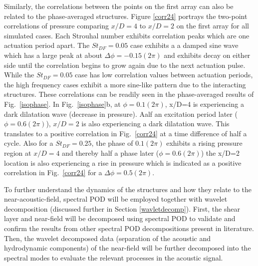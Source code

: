 \documentclass[english]{aiaa-tc}
\begin{document}
Similarly, the correlations between the points on the first array can
also be related to the phase-averaged structures. Figure \ref{corr24}
portrays the two-point correlations of pressure comparing $x/D=4$ to
$x/D=2$ on the first array for all simulated 
cases. Each Strouhal number exhibits correlation peaks which are one
actuation period apart. The $St_{DF}=0.05$ case exhibits a a damped sine wave which has a large peak
at about $\Delta \phi=-0.15(2\pi)$ 
and exhibits decay on either
side until the correlation begins to grow again due to the next
actuation pulse. While the $St_{DF}=0.05$ case has low correlation
values between actuation periods, the high frequency cases exhibit a
more sine-like pattern due to the interacting structures.  These
correlations can be readily seen in the phase-averaged results of
Fig.~\ref{isophase}. In Fig.~\ref{isophase}b, at $\phi=0.1(2\pi)$,
x/D=4 is experiencing a dark dilatation wave (decrease in pressure). 
Aalf an excitation period later ($\phi=0.6(2\pi)$), $x/D=2$ is also
experiencing a dark dilatation wave. This translates to a
positive correlation in Fig.~\ref{corr24} at a time difference of half
a cycle. Also for a
$St_{DF}=0.25$, the phase of $0.1(2\pi)$ exhibits a rising pressure
region at $x/D=4$ and thereby half a phase later ($\phi=0.6(2\pi)$)
the x/D=2 location is also experiencing a rise in pressure which is
indicated as a positive correlation in Fig.~\ref{corr24} for a $\Delta
\phi=0.5(2\pi)$. 

To further understand the dynamics of the structures and how they
relate to the near-acoustic-field, spectral POD will be employed together
with wavelet decomposition (discussed further in Section
\ref{wavletdecomp}). First, the shear layer and near-field will be
decomposed using spectral POD to validate and confirm the results from
other spectral POD decompositions present in
literature.\cite{jordan2007,Arndt1997,freund2002} Then, the wavelet
decomposed data (separation of the acoustic and hydrodynamic
components) of the near-field will be further decomposed into the spectral
modes to evaluate the relevant processes in the acoustic signal. 
\end{document}
